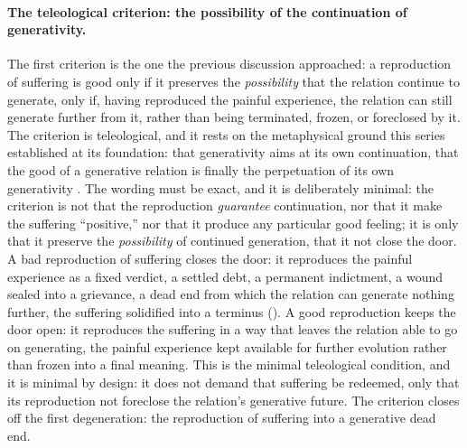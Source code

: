 \paragraph{The teleological criterion: the possibility of the continuation of generativity.}
The first criterion is the one the previous discussion approached: a reproduction of suffering is good only if it preserves the \emph{possibility} that the relation continue to generate, only if, having reproduced the painful experience, the relation can still generate further from it, rather than being terminated, frozen, or foreclosed by it. The criterion is teleological, and it rests on the metaphysical ground this series established at its foundation: that generativity aims at its own continuation, that the good of a generative relation is finally the perpetuation of its own generativity \parencite{paperix}. The wording must be exact, and it is deliberately minimal: the criterion is not that the reproduction \emph{guarantee} continuation, nor that it make the suffering ``positive,'' nor that it produce any particular good feeling; it is only that it preserve the \emph{possibility} of continued generation, that it not close the door. A bad reproduction of suffering closes the door: it reproduces the painful experience as a fixed verdict, a settled debt, a permanent indictment, a wound sealed into a grievance, a dead end from which the relation can generate nothing further, the suffering solidified into a terminus (). A good reproduction keeps the door open: it reproduces the suffering in a way that leaves the relation able to go on generating, the painful experience kept available for further evolution rather than frozen into a final meaning. This is the minimal teleological condition, and it is minimal by design: it does not demand that suffering be redeemed, only that its reproduction not foreclose the relation's generative future. The criterion closes off the first degeneration: the reproduction of suffering into a generative dead end.


